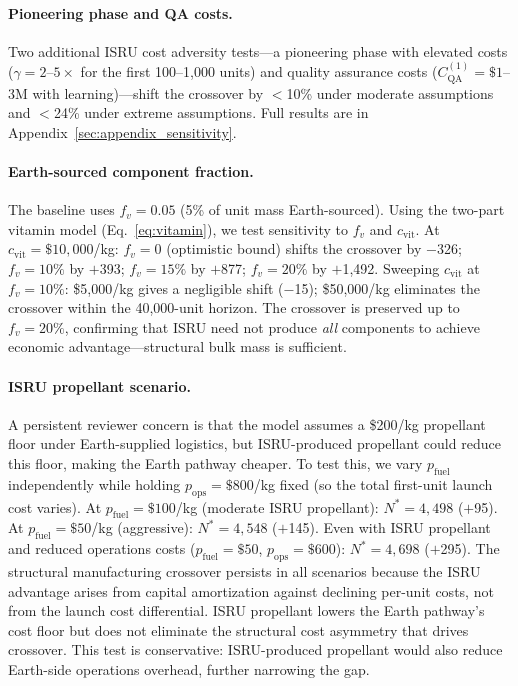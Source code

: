 \documentclass[preprint,12pt]{elsarticle}
\begin{document}
\paragraph{Pioneering phase and QA costs.} Two additional ISRU cost adversity tests---a pioneering phase with elevated costs ($\gamma = 2$--$5\times$ for the first 100--1{,}000 units) and quality assurance costs ($C_{\mathrm{QA}}^{(1)} = \$1$--$3$M with learning)---shift the crossover by $<$10\% under moderate assumptions and $<$24\% under extreme assumptions. Full results are in Appendix~\ref{sec:appendix_sensitivity}.

\paragraph{Earth-sourced component fraction.} The baseline uses $f_v = 0.05$ (5\% of unit mass Earth-sourced). Using the two-part vitamin model (Eq.~\ref{eq:vitamin}), we test sensitivity to $f_v$ and $c_{\mathrm{vit}}$. At $c_{\mathrm{vit}} = \$10{,}000$/kg: $f_v = 0$ (optimistic bound) shifts the crossover by $-$326; $f_v = 10\%$ by $+$393; $f_v = 15\%$ by $+$877; $f_v = 20\%$ by $+$1{,}492. Sweeping $c_{\mathrm{vit}}$ at $f_v = 10\%$: \$5{,}000/kg gives a negligible shift ($-$15); \$50{,}000/kg eliminates the crossover within the 40{,}000-unit horizon. The crossover is preserved up to $f_v = 20\%$, confirming that ISRU need not produce \emph{all} components to achieve economic advantage---structural bulk mass is sufficient.

\paragraph{ISRU propellant scenario.} A persistent reviewer concern is that the model assumes a \$200/kg propellant floor under Earth-supplied logistics, but ISRU-produced propellant could reduce this floor, making the Earth pathway cheaper. To test this, we vary $p_{\mathrm{fuel}}$ independently while holding $p_{\mathrm{ops}} = \$800$/kg fixed (so the total first-unit launch cost varies). At $p_{\mathrm{fuel}} = \$100$/kg (moderate ISRU propellant): $N^* = 4{,}498$ ($+$95). At $p_{\mathrm{fuel}} = \$50$/kg (aggressive): $N^* = 4{,}548$ ($+$145). Even with ISRU propellant and reduced operations costs ($p_{\mathrm{fuel}} = \$50$, $p_{\mathrm{ops}} = \$600$): $N^* = 4{,}698$ ($+$295). The structural manufacturing crossover persists in all scenarios because the ISRU advantage arises from capital amortization against declining per-unit costs, not from the launch cost differential. ISRU propellant lowers the Earth pathway's cost floor but does not eliminate the structural cost asymmetry that drives crossover. This test is conservative: ISRU-produced propellant would also reduce Earth-side operations overhead, further narrowing the gap.
\end{document}
